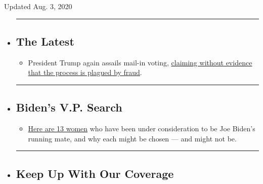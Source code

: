 Updated Aug. 3, 2020

\begin{itemize}
\item
  \begin{center}\rule{0.5\linewidth}{\linethickness}\end{center}

  \hypertarget{the-latest}{%
  \subsection{The Latest}\label{the-latest}}

  \begin{itemize}
  \tightlist
  \item
    President Trump again assails mail-in voting,
    \href{https://www.nytimes.com/2020/08/03/us/politics/trump-mail-in-voting.html?action=click\&pgtype=Article\&state=default\&region=BELOW_MAIN_CONTENT\&context=storylines_guide}{claiming
    without evidence that the process is plagued by fraud}.
  \end{itemize}
\item
  \begin{center}\rule{0.5\linewidth}{\linethickness}\end{center}

  \hypertarget{bidens-vp-search}{%
  \subsection{Biden's V.P. Search}\label{bidens-vp-search}}

  \begin{itemize}
  \tightlist
  \item
    \href{https://www.nytimes.com/article/biden-vice-president-2020.html?action=click\&pgtype=Article\&state=default\&region=BELOW_MAIN_CONTENT\&context=storylines_guide}{Here
    are 13 women} who have been under consideration to be Joe Biden's
    running mate, and why each might be chosen --- and might not be.
  \end{itemize}
\item
  \begin{center}\rule{0.5\linewidth}{\linethickness}\end{center}

  \hypertarget{keep-up-with-our-coverage}{%
  \subsection{Keep Up With Our
  Coverage}\label{keep-up-with-our-coverage}}


\end{itemize}
